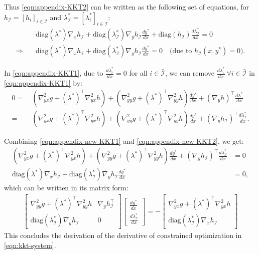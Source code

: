 Thus \cref{eqn:appendix-KKT2} can be written as the following set of equations, for  $h_\mathcal{I} = [h_i]_{i \in \mathcal{I}}$ and $\lambda^*_\mathcal{I} = [\lambda^*_i]_{i\in \mathcal{I}}$:
\begin{align}
    & \text{diag}(\lambda^*) \nabla_x h_\mathcal{I} + \text{diag}(\lambda^*_\mathcal{I}) \nabla_y h_\mathcal{I} \frac{dy^*}{dx} + \text{diag}(h_\mathcal{I}) \frac{d\lambda^*_\mathcal{I}}{dx} = 0 \nonumber \\
    \Longrightarrow \quad & \text{diag}(\lambda^*) \nabla_x h_\mathcal{I} + \text{diag}(\lambda^*_\mathcal{I}) \nabla_y h_\mathcal{I} \frac{dy^*}{dx} = 0 \quad \text{(due to $h_\mathcal{I}(x,y^*) = 0$)}. \label{eqn:appendix-new-KKT2}
\end{align}

In \cref{eqn:appendix-KKT1}, due to $\frac{d \lambda^*_i}{dx} = 0$ for all $i \in \bar{\mathcal{I}}$, we can remove $\frac{d \lambda^*_i}{dx} ~\forall i \in \bar{\mathcal{I}}$ in \cref{eqn:appendix-KKT1} by:
\begin{align}
    0 = & ~ (\nabla^2_{yx} g + (\lambda^*)^\top \nabla_{yx}^2 h) + (\nabla^2_{yy} g + (\lambda^*)^\top \nabla_{yy}^2 h) \frac{dy^*}{dx} + (\nabla_y h)^\top \frac{d\lambda^*}{dx} \nonumber \\
    = & ~ (\nabla^2_{yx} g + (\lambda^*)^\top \nabla_{yx}^2 h) + (\nabla^2_{yy} g + (\lambda^*)^\top \nabla_{yy}^2 h) \frac{dy^*}{dx} + (\nabla_y h_\mathcal{I})^\top \frac{d\lambda^*_\mathcal{I}}{dx}. 
    \label{eqn:appendix-new-KKT1} 
\end{align}

Combining \cref{eqn:appendix-new-KKT1} and \cref{eqn:appendix-new-KKT2}, we get:
\begin{align*}
    (\nabla^2_{yx} g + (\lambda^*)^\top \nabla_{yx}^2 h) + (\nabla^2_{yy} g + (\lambda^*)^\top \nabla_{yy}^2 h) \frac{dy^*}{dx} + (\nabla_y h_\mathcal{I})^\top \frac{d\lambda^*_\mathcal{I}}{dx} &= 0 \\
    \text{diag}(\lambda^*) \nabla_x h_\mathcal{I} + \text{diag}(\lambda^*_\mathcal{I}) \nabla_y h_\mathcal{I} \frac{dy^*}{dx} &= 0, 
\end{align*}
which can be written in its matrix form:
\begin{align}\label{eqn:kkt-system_appendix}
\begin{bmatrix}
\nabla^2_{yy} g + (\lambda^*)^\top \nabla_{yy}^2 h & \nabla_y h_\mathcal{I}^\top \\
\text{diag}(\lambda^*_\mathcal{I}) \nabla_y h_\mathcal{I} & 0
\end{bmatrix}
\begin{bmatrix}
    \frac{dy^*}{dx} \\
    \frac{d\lambda^*_\mathcal{I}}{dx}
\end{bmatrix}
= 
-
\begin{bmatrix}
    \nabla^2_{yx} g + (\lambda^*)^\top \nabla_{yx}^2 h \\
    \text{diag}(\lambda^*_\mathcal{I}) \nabla_x h_\mathcal{I}
\end{bmatrix}
\end{align}
This concludes the derivation of the derivative of constrained optimization in \cref{eqn:kkt-system}.


